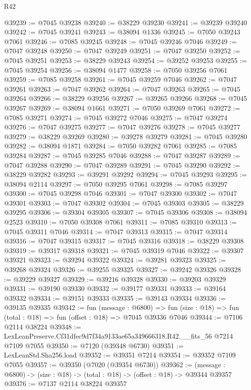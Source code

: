 \begin{lexlean}{R42}
\begin{coremodule}
{@39239 := @7045 @39238
@39240 := @38229 @39230
@39241 := @39239 @39240
@39242 := @7045 @39241
@39243 := @38094 @1336
@39245 := @7050 @39243 @7061
@39246 := @7085 @39245
@39248 := @7045 @39246 @7046
@39249 := @7047 @39248
@39250 := @7047 @39249
@39251 := @7047 @39250
@39252 := @7045 @39251
@39253 := @38229 @39243
@39254 := @39252 @39253
@39255 := @7045 @39254
@39256 := @38094 @1477
@39258 := @7050 @39256 @7061
@39259 := @7085 @39258
@39261 := @7045 @39259 @7046
@39262 := @7047 @39261
@39263 := @7047 @39262
@39264 := @7047 @39263
@39265 := @7045 @39264
@39266 := @38229 @39256
@39267 := @39265 @39266
@39268 := @7045 @39267
@39269 := @38094 @1661
@39271 := @7050 @39269 @7061
@39272 := @7085 @39271
@39274 := @7045 @39272 @7046
@39275 := @7047 @39274
@39276 := @7047 @39275
@39277 := @7047 @39276
@39278 := @7045 @39277
@39279 := @38229 @39269
@39280 := @39278 @39279
@39281 := @7045 @39280
@39282 := @38094 @1871
@39284 := @7050 @39282 @7061
@39285 := @7085 @39284
@39287 := @7045 @39285 @7046
@39288 := @7047 @39287
@39289 := @7047 @39288
@39290 := @7047 @39289
@39291 := @7045 @39290
@39292 := @38229 @39282
@39293 := @39291 @39292
@39294 := @7045 @39293
@39295 := @38094 @2114
@39297 := @7050 @39295 @7061
@39298 := @7085 @39297
@39300 := @7045 @39298 @7046
@39301 := @7047 @39300
@39302 := @7047 @39301
@39303 := @7047 @39302
@39304 := @7045 @39303
@39305 := @38229 @39295
@39306 := @39304 @39305
@39307 := @7045 @39306
@39308 := @38094 @2523
@39310 := @7050 @39308 @7061
@39311 := @7085 @39310
@39313 := @7045 @39311 @7046
@39314 := @7047 @39313
@39315 := @7047 @39314
@39316 := @7047 @39315
@39317 := @7045 @39316
@39318 := @38229 @39308
@39319 := @39317 @39318
@39321 := @7045 @39319 @7046
@39322 := @39307 @39321
@39323 := @39294 @39322
@39324 := @39281 @39323
@39325 := @39268 @39324
@39326 := @39255 @39325
@39327 := @39242 @39326
@39328 := @39229 @39327
@39329 := @39216 @39328
@39330 := @39203 @39329
@39331 := @39190 @39330
@39332 := @39177 @39331
@39333 := @39164 @39332
@39334 := @39151 @39333
@39335 := @39143 @39334
@39336 := @39135 @39335
@39342 := fun (message : @6800) =>
  fun (size : @18) => fun (total : @18) => fun (offset : @18) => @7045 @39336 @7046
@39344 := @7106 @2114 @38224
@39348 := LexLeanPreserve.Cf31dfec9d7f34a9133ae65a349666318.R42.__fits_56 @7214 @7109 @7055
@39350 := @7120 (@39348 @6730)
@39351 := LexLeanStd.Sha256.load
@39352 := @39351 @7214
@39354 := @39352 @7109 @7055
@39357 := @39350 (@7020 (@39354 @6730))
@39362 := (message : @6800) -> (size : @18) -> (total : @18) -> (offset : @18) -> @39344 @39357
@39376 := @7137
    @2114
    @38224
    @39357
}
\end{coremodule}
\end{lexlean}
